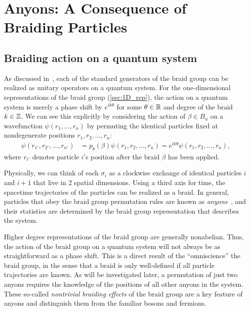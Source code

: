 \chapter{Anyons: A Consequence of Braiding Particles}\label{ch:anyons}

\section{Braiding action on a quantum system}
As discussed in~\cite{Deshmukh}, each of the standard generators of the braid group can be realized as unitary operators on a quantum system. For the one-dimensional representations of the braid group (\cref{sec:1D_rep}), the action on a quantum system is merely a phase shift by $e^{ik\theta}$ for some $\theta\in\mathbb{R}$ and degree of the braid $k\in\mathbb{Z}$. We can see this explicitly by considering the action of $\beta\in B_n$ on a wavefunction $\psi(r_1,\dots,r_n)$ by permuting the identical particles fixed at nondegenerate positions $r_1,r_2,\dots,r_n$:
\begin{align}
    \psi(r_{1'},r_{2'},\dots,r_{n'}) &= p_\theta(\beta)\psi(r_1,r_2,\dots,r_n) = e^{ik\theta}\psi(r_1,r_2,\dots,r_n),
\end{align}
where $r_{i'}$ denotes particle $i$'s position after the braid $\beta$ has been applied. 

Physically, we can think of each $\sigma_i$ as a clockwise exchange of identical particles $i$ and $i+1$ that live in 2 spatial dimensions. Using a third axis for time, the spacetime trajectories of the particles can be realized as a braid. In general, particles that obey the braid group permutation rules are known as \textit{anyons}~\cite{Wilczek1982}, and their statistics are determined by the braid group representation that describes the system.

Higher degree representations of the braid group are generally nonabelian. Thus, the action of the braid group on a quantum system will not always be as straightforward as a phase shift. This is a direct result of the ``omniscience'' the braid group, in the sense that a braid is only well-defined if all particle trajectories are known. As will be investigated later, a permutation of just two anyons requires the knowledge of the positions of all other anyons in the system. 
These so-called \textit{nontrivial braiding effects} of the braid group are a key feature of anyons and distinguish them from the familiar bosons and fermions.

